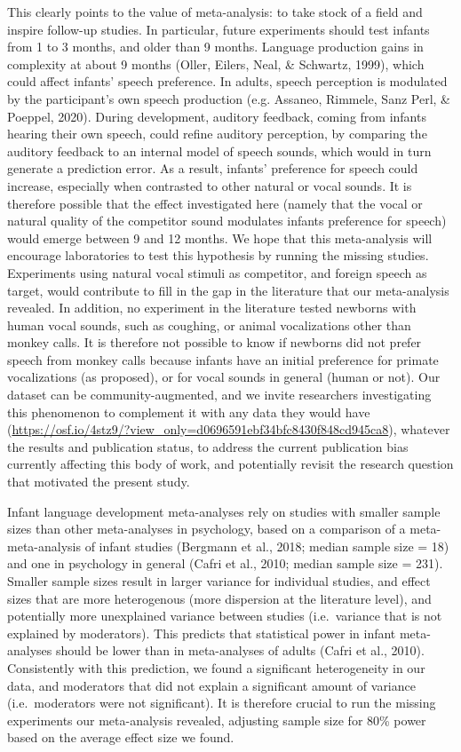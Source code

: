 \documentclass[
  man,mask,floatsintext]{apa6}
\begin{document}
This clearly points to the value of meta-analysis: to take stock of a field and inspire follow-up studies. In particular, future experiments should test infants from 1 to 3 months, and older than 9 months. Language production gains in complexity at about 9 months (Oller, Eilers, Neal, \& Schwartz, 1999), which could affect infants' speech preference. In adults, speech perception is modulated by the participant's own speech production (e.g. Assaneo, Rimmele, Sanz Perl, \& Poeppel, 2020). During development, auditory feedback, coming from infants hearing their own speech, could refine auditory perception, by comparing the auditory feedback to an internal model of speech sounds, which would in turn generate a prediction error. As a result, infants' preference for speech could increase, especially when contrasted to other natural or vocal sounds. It is therefore possible that the effect investigated here (namely that the vocal or natural quality of the competitor sound modulates infants preference for speech) would emerge between 9 and 12 months. We hope that this meta-analysis will encourage laboratories to test this hypothesis by running the missing studies. Experiments using natural vocal stimuli as competitor, and foreign speech as target, would contribute to fill in the gap in the literature that our meta-analysis revealed. In addition, no experiment in the literature tested newborns with human vocal sounds, such as coughing, or animal vocalizations other than monkey calls. It is therefore not possible to know if newborns did not prefer speech from monkey calls because infants have an initial preference for primate vocalizations (as proposed), or for vocal sounds in general (human or not). Our dataset can be community-augmented, and we invite researchers investigating this phenomenon to complement it with any data they would have (\url{https://osf.io/4stz9/?view_only=d0696591ebf34bfc8430f848cd945ca8}), whatever the results and publication status, to address the current publication bias currently affecting this body of work, and potentially revisit the research question that motivated the present study.

Infant language development meta-analyses rely on studies with smaller sample sizes than other meta-analyses in psychology, based on a comparison of a meta-meta-analysis of infant studies (Bergmann et al., 2018; median sample size = 18) and one in psychology in general (Cafri et al., 2010; median sample size = 231). Smaller sample sizes result in larger variance for individual studies, and effect sizes that are more heterogenous (more dispersion at the literature level), and potentially more unexplained variance between studies (i.e.~variance that is not explained by moderators). This predicts that statistical power in infant meta-analyses should be lower than in meta-analyses of adults (Cafri et al., 2010). Consistently with this prediction, we found a significant heterogeneity in our data, and moderators that did not explain a significant amount of variance (i.e.~moderators were not significant). It is therefore crucial to run the missing experiments our meta-analysis revealed, adjusting sample size for 80\% power based on the average effect size we found.
\end{document}
